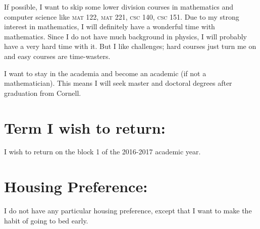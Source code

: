 	If possible, I want to skip some lower division courses in mathematics and
	computer science like \textsc{mat} 122, \textsc{mat} 221, \textsc{csc} 140,
	\textsc{csc} 151. Due to my strong interest in mathematics, I will definitely
	have a wonderful time with mathematics. Since I do not have much background in
	physics, I will probably have a very hard time with it. But I like challenges;
	hard courses just turn me on and easy courses are time-wasters.
	
	I want to stay in the academia and become an academic (if not a mathematician).
	This means I will seek master and doctoral degrees after graduation from
	Cornell.

	\section*{Term I wish to return:}
	I wish to return on the block 1 of the 2016-2017 academic year.
	
	\section*{Housing Preference:}
	I do not have any particular housing preference, except that I want to make the
	habit of going to bed early.
	
	\clearpage
	
	\printbibliography
